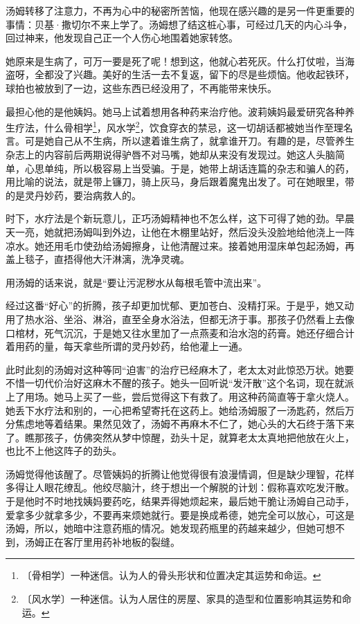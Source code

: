 \documentclass[12pt,UTF-8,openany]{ctexbook}
\begin{document}
\begin{Large}
    
    汤姆转移了注意力，不再为心中的秘密所苦恼，他现在感兴趣的是另一件更重要的事情：贝基·撒切尔不来上学了。汤姆想了结这桩心事，可经过几天的内心斗争，回过神来，他发现自己正一个人伤心地围着她家转悠。
    
    她原来是生病了，可万一要是死了呢！想到这，他就心若死灰。什么打仗啦，当海盗呀，全都没了兴趣。美好的生活一去不复返，留下的尽是些烦恼。他收起铁环，球拍也被放到了一边，这些东西已经没用了，不再能带来快乐。
    
    最担心他的是他姨妈。她马上试着想用各种药来治疗他。波莉姨妈最爱研究各种养生疗法，什么骨相学\footnote{〔骨相学〕一种迷信。认为人的骨头形状和位置决定其运势和命运。}，风水学\footnote{〔风水学〕一种迷信。认为人居住的房屋、家具的造型和位置影响其运势和命运。}，饮食穿衣的禁忌，这一切胡话都被她当作至理名言。可是她自己从不生病，所以逮着谁生病了，就拿谁开刀。有趣的是，尽管养生杂志上的内容前后两期说得驴唇不对马嘴，她却从来没有发现过。她这人头脑简单，心思单纯，所以极容易上当受骗。于是，她带上胡话连篇的杂志和骗人的药，用比喻的说法，就是带上镰刀，骑上灰马，身后跟着魔鬼出发了。可在她眼里，带的是灵丹妙药，要治病救人的。
    
    时下，水疗法是个新玩意儿，正巧汤姆精神也不怎么样，这下可得了她的劲。早晨天一亮，她就把汤姆叫到外边，让他在木棚里站好，然后没头没脸地给他浇上一阵凉水。她还用毛巾使劲给汤姆擦身，让他清醒过来。接着她用湿床单包起汤姆，再盖上毯子，直捂得他大汗淋漓，洗净灵魂。
    
    用汤姆的话来说，就是“要让污泥秽水从每根毛管中流出来”。
    
    经过这番“好心”的折腾，孩子却更加忧郁、更加苍白、没精打采。于是乎，她又动用了热水浴、坐浴、淋浴，直至全身水浴法，但都无济于事。那孩子仍然看上去像口棺材，死气沉沉，于是她又往水里加了一点燕麦和治水泡的药膏。她还仔细合计着用药的量，每天拿些所谓的灵丹妙药，给他灌上一通。
    
    此时此刻的汤姆对这种等同“迫害”的治疗已经麻木了，老太太对此惊恐万状。她要不惜一切代价治好这麻木不醒的孩子。她头一回听说“发汗散”这个名词，现在就派上了用场。她马上买了一些，尝后觉得这下有救了。用这种药简直等于拿火烧人。她丢下水疗法和别的，一心把希望寄托在这药上。她给汤姆服了一汤匙药，然后万分焦虑地等着结果。果然见效了，汤姆不再麻木不仁了，她心头的大石终于落下来了。瞧那孩子，仿佛突然从梦中惊醒，劲头十足，就算老太太真地把他放在火上，也比不上他这阵子的劲头。
    
    汤姆觉得他该醒了。尽管姨妈的折腾让他觉得很有浪漫情调，但是缺少理智，花样多得让人眼花缭乱。他绞尽脑汁，终于想出一个解脱的计划：假称喜欢吃发汗散。于是他时不时地找姨妈要药吃，结果弄得她烦起来，最后她干脆让汤姆自己动手，爱拿多少就拿多少，不要再来烦她就行。要是换成希德，她完全可以放心，可这是汤姆，所以，她暗中注意药瓶的情况。她发现药瓶里的药越来越少，但她可想不到，汤姆正在客厅里用药补地板的裂缝。
    

\end{Large}
\end{document}
